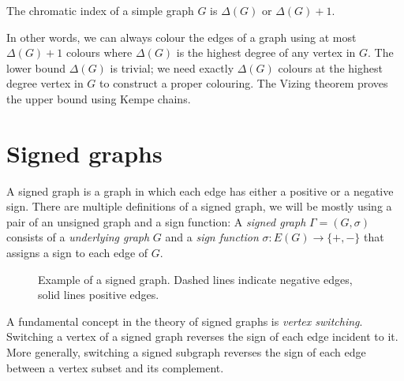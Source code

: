 \begin{theorem}[Vizing]
    The chromatic index of a simple graph $G$ is $\Delta(G)$ or $\Delta(G) + 1$.
\end{theorem}

In other words, we can always colour the edges of a graph using at most $\Delta(G) + 1$ colours where $\Delta(G)$ is the highest degree of any vertex in $G$. The lower bound $\Delta(G)$ is trivial; we need exactly $\Delta(G)$ colours at the highest degree vertex in $G$ to construct a proper colouring. The Vizing theorem proves the upper bound using Kempe chains.

\section{Signed graphs}

A signed graph is a graph in which each edge has either a positive or a negative sign. There are multiple definitions of a signed graph, we will be mostly using a pair of an unsigned graph and a sign function:
A \textit{signed graph} $\Gamma = (G, \sigma)$ consists of a \textit{underlying graph} $G$ and a \textit{sign function} $\sigma : E(G) \rightarrow \{+,-\}$ that assigns a sign to each edge of $G$.

\begin{figure}[h]
    \centering
    \caption[Example of a signed graph]{Example of a signed graph. Dashed lines indicate negative edges, solid lines positive edges.}
\end{figure}

A fundamental concept in the theory of signed graphs is \textit{vertex switching}. Switching a vertex of a signed graph reverses the sign of each edge incident to it. More generally, switching a signed subgraph reverses the sign of each edge between a vertex subset and its complement.

